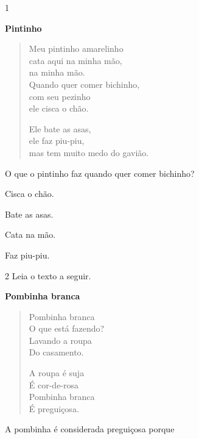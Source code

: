 
\num{1}

\textbf{Pintinho}

\begin{verse}
Meu pintinho amarelinho\\
cata aqui na minha mão,\\ 
na minha mão.\\
Quando quer comer bichinho,\\ 
com seu pezinho\\ 
ele cisca o chão.

Ele bate as asas,\\
ele faz piu-piu,\\ 
mas tem muito medo do gavião.
\end{verse}


O que o pintinho faz quando quer comer bichinho?

\begin{escolha}
	\item Cisca o chão.

	\item Bate as asas.

	\item Cata na mão.

	\item Faz piu-piu.
\end{escolha}

\num{2} Leia o texto a seguir.

\textbf{Pombinha branca}

\begin{verse}
Pombinha branca \\
O que está fazendo?\\
Lavando a roupa\\
Do casamento.

A roupa é suja\\
É cor-de-rosa\\
Pombinha branca\\
É preguiçosa.

\end{verse}


A pombinha é considerada preguiçosa porque

